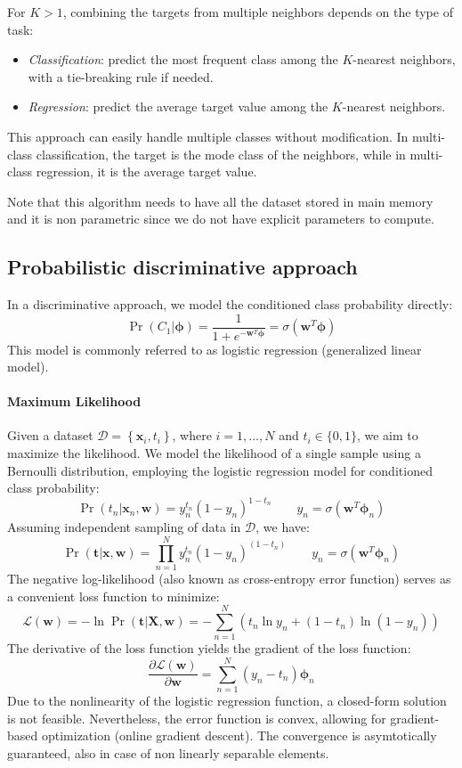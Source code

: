 For $K > 1$, combining the targets from multiple neighbors depends on the type of task:
\begin{itemize}
    \item \textit{Classification}: predict the most frequent class among the $K$-nearest neighbors, with a tie-breaking rule if needed.
    \item \textit{Regression}: predict the average target value among the $K$-nearest neighbors.
\end{itemize}
This approach can easily handle multiple classes without modification. 
In multi-class classification, the target is the mode class of the neighbors, while in multi-class regression, it is the average target value.

Note that this algorithm needs to have all the dataset stored in main memory and it is non parametric since we do not have explicit parameters to compute. 

\subsection{Probabilistic discriminative approach}
In a discriminative approach, we model the conditioned class probability directly:
\[\Pr(C_1|\boldsymbol{\phi})=\dfrac{1}{1+e^{-\textbf{w}^T\boldsymbol{\phi}}}=\sigma(\textbf{w}^T\boldsymbol{\phi})\]
This model is commonly referred to as logistic regression (generalized linear model).

\paragraph*{Maximum Likelihood}
Given a dataset $\mathcal{D}=\left\{ \textbf{x}_i,t_i \right\}$, where $i=1,\dots,N$ and $t_i \in \{0,1\}$, we aim to maximize the likelihood.
We model the likelihood of a single sample using a Bernoulli distribution, employing the logistic regression model for conditioned class probability:
\[\Pr(t_n|\textbf{x}_n,\textbf{w})=y_n^{t_n}{\left( 1-y_n \right)}^{1-t_n} \qquad y_n=\sigma(\textbf{w}^T\boldsymbol{\phi}_n)\]
Assuming independent sampling of data in $\mathcal{D}$, we have:
\[\Pr(\textbf{t}|\textbf{x},\textbf{w})=\prod_{n=1}^N y_n^{t_n}{\left( 1-y_n \right)}^{(1-t_n)} \qquad y_n=\sigma(\textbf{w}^T\boldsymbol{\phi}_n)\]
The negative log-likelihood (also known as cross-entropy error function) serves as a convenient loss function to minimize:
\[\mathcal{L}(\textbf{w})=-\ln \Pr(\textbf{t}|\textbf{X},\textbf{w})=-\sum_{n=1}^N \left( t_n\ln y_n +(1-t_n) \ln (1-y_n) \right)\]
The derivative of the loss function yields the gradient of the loss function:
\[\dfrac{\partial\mathcal{L}(\textbf{w})}{\partial\mathbf{w}}=\sum_{n=1}^N\left( y_n-t_n \right) \boldsymbol{\phi}_n\]
Due to the nonlinearity of the logistic regression function, a closed-form solution is not feasible. 
Nevertheless, the error function is convex, allowing for gradient-based optimization (online gradient descent).
The convergence is asymtotically guaranteed, also in case of non linearly separable elements. 

